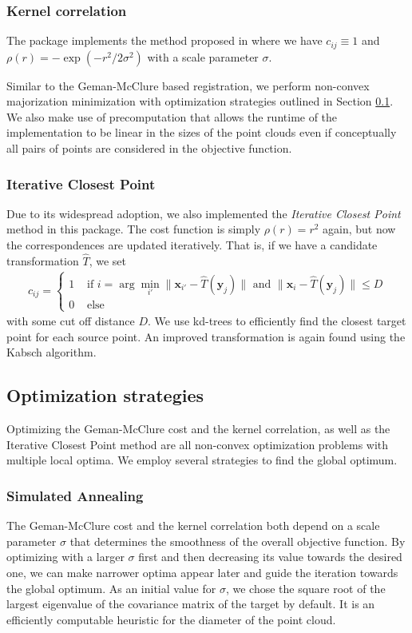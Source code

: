 \subsubsection{Kernel correlation}
The package implements the method proposed in \cite{our-kc-paper}
where we have $c_{i j} \equiv 1$ and $\rho(r) = - \exp(-r^2 / 2 \sigma^2)$ with
a scale parameter $\sigma$.

Similar to the Geman-McClure based registration, we perform non-convex
majorization minimization with optimization strategies outlined in Section
\ref{sec:opt-strats}.
We also make use of precomputation that allows the runtime of the
implementation to be linear in the sizes of the point clouds even if
conceptually all pairs of points are considered in the objective function.

\subsubsection{Iterative Closest Point}
Due to its widespread adoption, we also implemented the \emph{Iterative Closest
Point} method in this package.
The cost function is simply $\rho(r) = r^2$ again, but now the correspondences
are updated iteratively.
That is, if we have a candidate transformation $\hat{T}$, we set
\begin{align*}
  c_{i j} = \begin{cases}
    1 & \text{ if }
      i = \arg\min_{i'} \lVert \bm{x}_{i'} - \hat{T}(\bm{y}_j) \rVert
      \text{ and }
      \lVert \bm{x}_i - \hat{T}(\bm{y}_j) \rVert \leq D \\
    0 & \text{ else}
  \end{cases}
\end{align*}
with some cut off distance $D$.
We use kd-trees to efficiently find the closest target point for each source
point.
An improved transformation is again found using the Kabsch algorithm.


\subsection{Optimization strategies}
\label{sec:opt-strats}

Optimizing the Geman-McClure cost and the kernel correlation, as well as the
Iterative Closest Point method are all non-convex optimization problems with
multiple local optima.
We employ several strategies to find the global optimum.

\subsubsection{Simulated Annealing}
The Geman-McClure cost and the kernel correlation both depend on a scale
parameter $\sigma$ that determines the smoothness of the overall objective
function.
By optimizing with a larger $\sigma$ first and then decreasing its value towards
the desired one, we can make narrower optima appear later and guide the
iteration towards the global optimum.
As an initial value for $\sigma$, we chose the square root of the largest
eigenvalue of the covariance matrix of the target by default.
It is an efficiently computable heuristic for the diameter of the point cloud.

